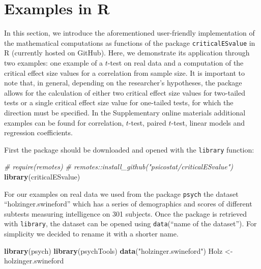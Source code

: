 \documentclass[
  man,floatsintext]{apa7}
\newenvironment{Shaded}{\begin{snugshade}}{\end{snugshade}}
\newcommand{\CommentTok}[1]{\textcolor[rgb]{0.56,0.35,0.01}{\textit{#1}}}
\newcommand{\FunctionTok}[1]{\textcolor[rgb]{0.13,0.29,0.53}{\textbf{#1}}}
\newcommand{\NormalTok}[1]{#1}
\newcommand{\OtherTok}[1]{\textcolor[rgb]{0.56,0.35,0.01}{#1}}
\newcommand{\StringTok}[1]{\textcolor[rgb]{0.31,0.60,0.02}{#1}}
\begin{document}
\normalsize

\section{Examples in R}\label{examples-in-r}

In this section, we introduce the aforementioned user-friendly implementation of the mathematical computations as functions of the package \texttt{criticalESvalue} in R (currently hosted on GitHub). Here, we demonstrate its application through two examples: one example of a \(t\)-test on real data and a computation of the critical effect size values for a correlation from sample size. It is important to note that, in general, depending on the researcher's hypotheses, the package allows for the calculation of either two critical effect size values for two-tailed tests or a single critical effect size value for one-tailed tests, for which the direction must be specified. In the Supplementary online materials additional examples can be found for correlation, \(t\)-test, paired \(t\)-test, linear models and regression coefficients.

First the package should be downloaded and opened with the \texttt{library} function:

\footnotesize

\begin{Shaded}
\begin{Highlighting}[]
\CommentTok{\# require(remotes)}
\CommentTok{\# remotes::install\_github("psicostat/criticalESvalue")}
\FunctionTok{library}\NormalTok{(criticalESvalue)}
\end{Highlighting}
\end{Shaded}

\normalsize

For our examples on real data we used from the package \texttt{psych} the dataset ``holzinger.swineford'' which has a series of demographics and scores of different subtests measuring intelligence on 301 subjects. Once the package is retrieved with \texttt{library}, the dataset can be opened using \texttt{data}(``name of the dataset''). For simplicity we decided to rename it with a shorter name.

\footnotesize

\begin{Shaded}
\begin{Highlighting}[]
\FunctionTok{library}\NormalTok{(psych)}
\FunctionTok{library}\NormalTok{(psychTools)}
\FunctionTok{data}\NormalTok{(}\StringTok{"holzinger.swineford"}\NormalTok{)}
\NormalTok{Holz }\OtherTok{\textless{}{-}}\NormalTok{ holzinger.swineford}
\end{Highlighting}
\end{Shaded}
\end{document}
